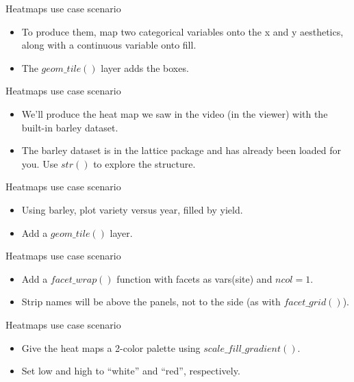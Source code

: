 \documentclass[
  ignorenonframetext,
]{beamer}
\begin{document}
\begin{frame}{Heatmaps use case scenario}
\label{heatmaps-use-case-scenario-1}
\begin{itemize}
\item
  To produce them, map two categorical variables onto the x and y
  aesthetics, along with a continuous variable onto fill.
\item
  The \(geom\_tile()\) layer adds the boxes.
\end{itemize}
\end{frame}

\begin{frame}{Heatmaps use case scenario}
\label{heatmaps-use-case-scenario-2}
\begin{itemize}
\item
  We'll produce the heat map we saw in the video (in the viewer) with
  the built-in barley dataset.
\item
  The barley dataset is in the lattice package and has already been
  loaded for you. Use \(str()\) to explore the structure.
\end{itemize}
\end{frame}

\begin{frame}{Heatmaps use case scenario}
\label{heatmaps-use-case-scenario-3}
\begin{itemize}
\item
  Using barley, plot variety versus year, filled by yield.
\item
  Add a \(geom\_tile()\) layer.
\end{itemize}
\end{frame}

\begin{frame}{Heatmaps use case scenario}
\label{heatmaps-use-case-scenario-4}
\begin{itemize}
\item
  Add a \(facet\_wrap()\) function with facets as vars(site) and
  \(ncol = 1\).
\item
  Strip names will be above the panels, not to the side (as with
  \(facet\_grid()\)).
\end{itemize}
\end{frame}

\begin{frame}{Heatmaps use case scenario}
\label{heatmaps-use-case-scenario-5}
\begin{itemize}
\item
  Give the heat maps a 2-color palette using
  \(scale\_fill\_gradient()\).
\item
  Set low and high to ``white'' and ``red'', respectively.
\end{itemize}
\end{frame}
\end{document}
